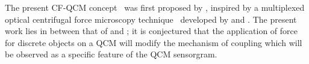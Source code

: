 The present CF-QCM concept~\cite{webster2013qcm} was first proposed by
, inspired by a multiplexed optical centrifugal force microscopy
technique~\cite{halvorsen2010massively} developed by  and
.  The present work lies in between that of 
and ; it is conjectured that the application of force for
discrete objects on a QCM will modify the mechanism of coupling which will
be observed as a specific feature of the QCM sensorgram.
